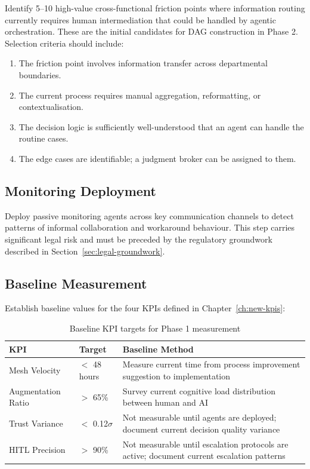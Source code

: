 Identify 5--10 high-value cross-functional friction points where information routing currently requires human intermediation that could be handled by agentic orchestration. These are the initial candidates for DAG construction in Phase 2. Selection criteria should include:

\begin{enumerate}
  \item The friction point involves information transfer across departmental boundaries.
  \item The current process requires manual aggregation, reformatting, or contextualisation.
  \item The decision logic is sufficiently well-understood that an agent can handle the routine cases.
  \item The edge cases are identifiable; a judgment broker can be assigned to them.
\end{enumerate}

\subsection{Monitoring Deployment}

Deploy passive monitoring agents across key communication channels to detect patterns of informal collaboration and workaround behaviour. This step carries significant legal risk and must be preceded by the regulatory groundwork described in Section~\ref{sec:legal-groundwork}.

\subsection{Baseline Measurement}

Establish baseline values for the four KPIs defined in Chapter~\ref{ch:new-kpis}:

\begin{table}[h]
\centering
\caption{Baseline KPI targets for Phase 1 measurement}
\label{tab:baseline-kpis}
\begin{tabularx}{\textwidth}{l l X}
\toprule
\textbf{KPI} & \textbf{Target} & \textbf{Baseline Method} \\
\midrule
Mesh Velocity & $<$ 48 hours & Measure current time from process improvement suggestion to implementation \\
\addlinespace
Augmentation Ratio & $>$ 65\% & Survey current cognitive load distribution between human and AI \\
\addlinespace
Trust Variance & $<$ 0.12$\sigma$ & Not measurable until agents are deployed; document current decision quality variance \\
\addlinespace
HITL Precision & $>$ 90\% & Not measurable until escalation protocols are active; document current escalation patterns \\
\bottomrule
\end{tabularx}
\end{table}


